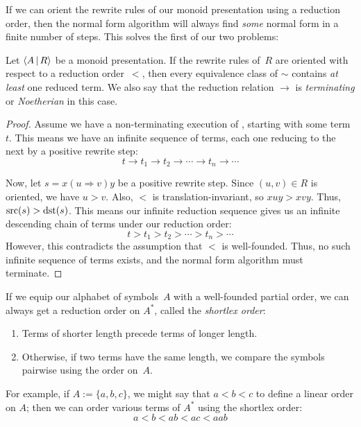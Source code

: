 \documentclass[../generics]{subfiles}
\begin{document}
If we can orient the rewrite rules of our monoid presentation using a reduction order, then the normal form algorithm will always find \emph{some} normal form in a finite number of steps. This solves the first of our two problems:

\begin{theorem}
Let $\langle A\,|\,R\rangle$ be a monoid presentation. If the rewrite rules of~$R$ are oriented with respect to a reduction order~$<$, then every equivalence class of $\sim$ contains \emph{at least} one reduced term. We also say that the reduction relation $\rightarrow$ is \emph{terminating} or \emph{Noetherian} in this case.
\end{theorem}
\begin{proof}
Assume we have a non-terminating execution of , starting with some term~$t$. This means we have an infinite sequence of terms, each one reducing to the next by a positive rewrite step:
\[ t\rightarrow t_1\rightarrow t_2 \rightarrow \cdots \rightarrow t_n \rightarrow \cdots \]

Now, let $s=x(u\Rightarrow v)y$ be a positive rewrite step. Since $(u,v)\in R$ is oriented, we have $u>v$. Also, $<$ is translation-invariant, so $xuy>xvy$. Thus, $\operatorname{src}(s)>\operatorname{dst}(s)$. This means our infinite reduction sequence gives us an infinite descending chain of terms under our reduction order:
\[ t > t_1 > t_2 > \cdots > t_n > \cdots \]
However, this contradicts the assumption that $<$ is well-founded. Thus, no such infinite sequence of terms exists, and the normal form algorithm must terminate.
\end{proof}

If we equip our alphabet of symbols~$A$ with a well-founded partial order, we can always get a reduction order on $A^*$, called the \emph{shortlex order}:
\begin{enumerate}
\item Terms of shorter length precede terms of longer length.
\item Otherwise, if two terms have the same length, we compare the symbols pairwise using the order on~$A$.
\end{enumerate}
For example, if $A:=\{a,b,c\}$, we might say that $a<b<c$ to define a linear order on $A$; then we can order various terms of $A^*$ using the shortlex order: \[a<b<ab<ac<aab\]
\end{document}
